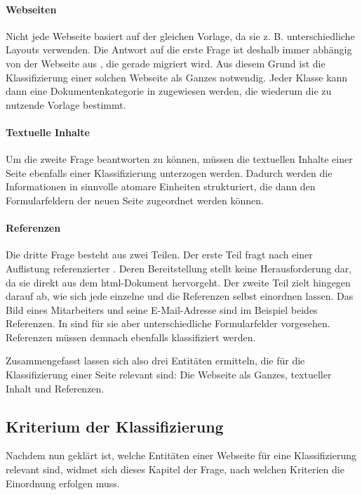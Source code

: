         \paragraph{Webseiten}
        Nicht jede Webseite basiert auf der gleichen Vorlage, da sie z. B. unterschiedliche Layouts verwenden.
        Die Antwort auf die erste Frage ist deshalb immer abhängig von der Webseite aus {\wordpress}, die gerade migriert wird.
        Aus diesem Grund ist die Klassifizierung einer solchen Webseite als Ganzes notwendig.
        Jeder Klasse kann dann eine Dokumentenkategorie in {\imperia}
        zugewiesen werden, die wiederum die zu nutzende Vorlage bestimmt.

        \paragraph{Textuelle Inhalte}
        Um die zweite Frage beantworten zu können,
        müssen die textuellen Inhalte einer Seite ebenfalls einer Klassifizierung
        unterzogen werden.
        Dadurch werden die Informationen in sinnvolle atomare Einheiten strukturiert,
        die dann den Formularfeldern der neuen Seite zugeordnet werden können.

        \paragraph{Referenzen}
        Die dritte Frage besteht aus zwei Teilen.
        Der erste Teil fragt nach einer Auflistung
        referenzierter {\resources}.
        Deren Bereitstellung stellt keine Herausforderung dar,
        da sie direkt aus dem \gls{html}-Dokument hervorgeht.
        Der zweite Teil zielt hingegen darauf ab,
        wie sich jede einzelne {\resource} und die Referenzen selbst einordnen lassen.
        Das Bild eines Mitarbeiters und seine E-Mail-Adresse sind im Beispiel beides Referenzen.
        In {\imperia} sind für sie aber unterschiedliche Formularfelder vorgesehen.
        Referenzen müssen demnach ebenfalls klassifiziert werden.

        Zusammengefasst lassen sich also drei Entitäten ermitteln,
        die für die Klassifizierung einer Seite relevant sind:
        Die Webseite als Ganzes, textueller Inhalt und Referenzen.

    \subsection{Kriterium der Klassifizierung}
        \label{section:ClassificationCriteria}
        Nachdem nun geklärt ist, welche Entitäten einer Webseite für
        eine Klassifizierung relevant sind,
        widmet sich dieses Kapitel der Frage, nach welchen
        Kriterien die Einordnung erfolgen muss.

